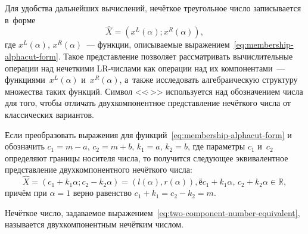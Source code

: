 Для удобства дальнейших вычислений, нечёткое треугольное число записывается в~форме
\begin{equation}
\label{eq:two-component-number}
  \hat{X} = \left(x^L\left(\alpha \right); x^R\left(\alpha \right) \right),
\end{equation}
где $x^L\left(\alpha \right)$, $x^R\left(\alpha \right)$~--- функции, описываемые выражением~\eqref{eq:membership-alphacut-form}. Такое представление позволяет рассматривать вычислительные операции над нечеткими LR-числами как операции над их компонентами~---  функциями~$x^L\left(\alpha \right)$ и~$x^R\left(\alpha \right)$, а~также исследовать алгебраическую структуру множества таких функций. Символ <<$\hat{\ }$>> используется над обозначением числа для того, чтобы отличать двухкомпонентное представление нечёткого числа от классических вариантов.

Если преобразовать выражения для функций~\eqref{eq:membership-alphacut-form} и обозначить $c_1=m-a$, $c_2=m+b$, $k_1=a$, $k_2=b$, где параметры $c_1$ и~$c_2$ определяют границы носителя числа, то получится следующее эквивалентное представление  двухкомпонентного нечёткого числа:
\begin{equation}
\label{eq:two-component-number-equivalent}
  \hat{X} = \left(c_1+k_1\alpha; c_2-k_2\alpha \right) = \left(l\left(\alpha \right), r\left(\alpha \right) \right),ё c_1+k_1\alpha,\, c_2+k_2\alpha \in \mathbb{R},
\end{equation}
причём при $\alpha=1$ верно равенство $c_1+k_1=c_2-k_2=m$.

\begin{mydef}
  Нечёткое число, задаваемое выражением~\eqref{eq:two-component-number-equivalent}, называется двухкомпонентным нечётким числом.
\end{mydef}


